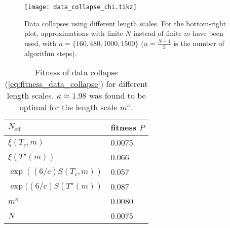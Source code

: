 \begin{figure}
  \texttt{[image: data\_collapse\_chi.tikz]}
  \caption{Data collapses using different length scales.
  For the bottom-right plot, approximations with finite $N$ instead of finite $m$ have been used,
  with $n = \{160, 480, 1000, 1500 \}$ ($n = \frac{N - 1}{2}$ is the number of algorithm
  steps).}\label{fig:data_collapse_chi}
\end{figure}

\begin{table}[]
\centering
\begin{tabular}{@{}ll@{}} \toprule
$N_{\text{eff}}$                  & fitness $P$ \\ \midrule
$\xi(T_c, m)$                     & 0.0075      \\
$\xi(T^{\star}(m))$               & 0.066       \\
$\exp((6/c)S(T_c, m))$            & 0.057       \\
$\exp((6/c)S(T^{\star}(m))$       & 0.087       \\
$m^{\kappa}$                      & 0.0080      \\
$N$                               & 0.0075      \\ \bottomrule
\end{tabular}
  \caption{Fitness of data collapse (\autoref{eq:fitness_data_collapse}) for different length scales.
  $\kappa \approx 1.98$ was found to be optimal for the length scale $m^{\kappa}$.}
  \label{table:fitness_data_collapse_different_length_scales}
\end{table}
